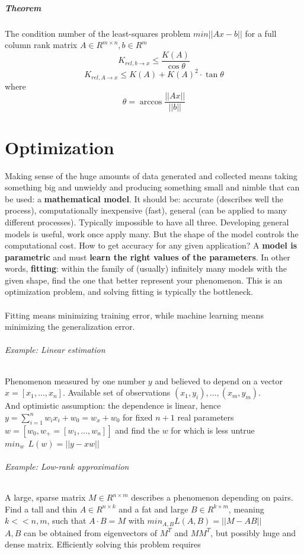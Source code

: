 \documentclass[10pt]{report}
\begin{document}
\paragraph{Theorem} The condition number of the least-squares problem $min||Ax-b||$ for a full column rank matrix $A\in R^{m\times n},b\in R^m$ $$K_{rel,b\rightarrow x }\leq \frac{K(A)}{\cos\theta}$$ $$K_{rel,A\rightarrow x} \leq K(A) + K(A)^2\cdot\tan\theta$$ where $$\theta=\arccos\frac{||Ax||}{||b||}$$
\chapter{Optimization}
Making sense of the huge amounts of data generated and collected means taking something big and unwieldy and producing something small and nimble that can be used: a \textbf{mathematical model}. It should be: accurate (describes well the process), computationally inexpensive (fast), general (can be applied to many different processes). Typically impossible to have all three. Developing general models is useful, work once apply many. But the shape of the model controls the computational cost. How to get accuracy for any given application? A \textbf{model is parametric} and must \textbf{learn the right values of the parameters}. In other words, \textbf{fitting}: within the family of (usually) infinitely many models with the given shape, find the one that better represent your phenomenon. This is an optimization problem, and solving fitting is typically the bottleneck.\\\\
Fitting means minimizing training error, while machine learning means minimizing the generalization error.
\subparagraph{Example: Linear estimation} Phenomenon measured by one number $y$ and believed to depend on a vector $x = [x_1,\ldots,x_n]$. Available set of observations $(x_1,y_i), \ldots, (x_m, y_m)$.\\
And optimistic assumption: the dependence is linear, hence $y = \sum_{i=1}^n w_ix_i+w_0 = w_x + w_0$ for fixed $n+1$ real parameters $w = [w_0, w_+=[w_1,\ldots,w_n]]$ and find the $w$ for which is less untrue $min_w\:\:L(w)=||y-xw||$
\subparagraph{Example: Low-rank approximation} A large, sparse matrix $M\in R^{n\times m}$ describes a phenomenon depending on pairs. Find a tall and thin $A\in R^{n\times k}$ and a fat and large $B\in R^{k\times m}$, meaning $k << n,m$, such that $A\cdot B = M$ with $min_{A,B} L(A,B) = ||M-AB||$\\
$A,B$ can be obtained from eigenvectors of $M^T$ and $MM^T$, but possibly huge and dense matrix. Efficiently solving this problem requires
\end{document}
